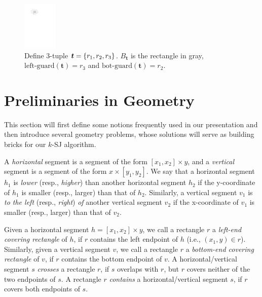 \documentclass[sigconf]{acmart}
\def\vgap{\vspace{1mm}}
\def\extraspacing{\vspace{2mm} \noindent}
\def\figcapup{\vspace{-0mm}}
\def\figcapdown{\vspace{-0mm}}
\def\gleft{\mathrm{left\text{-}guard}}
\def\gbot{\mathrm{bot\text{-}guard}}
\begin{document}
\begin{figure}
    \includegraphics[height=23mm]{./artwork/guard}

    \figcapup
    \caption{Define 3-tuple $\textrm{\boldmath${t}$} = \{r_1, r_2, r_3\}$. $B_\bm{t}$ is the rectangle in gray, $\gleft(\bm{t}) = r_3$ and $\gbot(\bm{t}) = r_2$.}
    \label{fig:guard}
    \figcapdown
\end{figure}


\section{Preliminaries in Geometry} \label{sec:bricks}

This section will first define some notions frequently used in our presentation and then introduce several  geometry problems, whose solutions will serve as building bricks for our $k$-SJ algorithm.

\extraspacing {\bf Terminology.} A {\em horizontal} segment is a segment of the form $[x_1, x_2] \times y$, and a {\em vertical} segment is a segment of the form $x \times [y_1, y_2]$. We say that a horizontal segment $h_1$ is {\em lower} (resp., {\em higher}) than another horizontal segment $h_2$ if the y-coordinate of $h_1$ is smaller (resp., larger) than that of $h_2$. Similarly, a vertical segment $v_1$ is {\em to the left} (resp., {\em right}) {\em of} another vertical segment $v_2$ if the x-coordinate of $v_1$ is smaller (resp., larger) than that of $v_2$.

Given a horizontal segment $h = [x_1, x_2] \times y$, we call a rectangle $r$ a {\em left-end covering rectangle} of $h$, if $r$ contains the left endpoint of $h$ (i.e., $(x_1, y) \in r$). Similarly, given a vertical segment $v$, we call a rectangle $r$ a {\em bottom-end covering rectangle} of $v$, if $r$ contains the bottom endpoint of $v$.  A horizontal/vertical segment $s$ {\em crosses} a rectangle $r$, if $s$ overlaps with $r$, but $r$ covers neither of the two endpoints of $s$. A rectangle $r$ {\em contains} a horizontal/vertical segment $s$, if $r$ covers both endpoints of $s$.

\vgap
\end{document}
